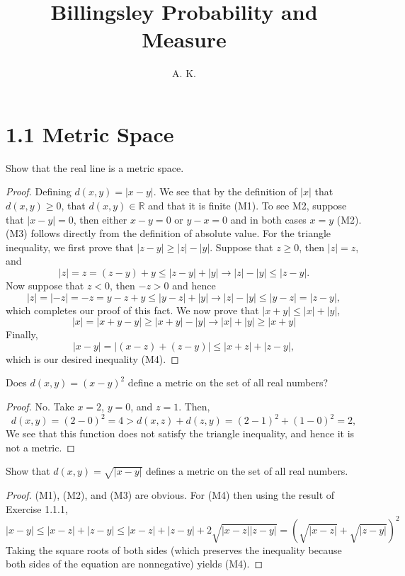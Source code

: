 \documentclass[12pt]{article}
\newcommand{\R}{\mathbb{R}}
\newenvironment{exercise}[2][Exercise]{\begin{trivlist}
\item[\hskip \labelsep {\bfseries #1}\hskip \labelsep {\bfseries #2.}]}{\end{trivlist}}
\begin{document}
\title{Billingsley Probability and Measure}%
\author{A. K.} %

\maketitle

\section*{1.1 Metric Space}
\begin{exercise}{1.1.1}
    Show that the real line is a metric space.
\end{exercise}
\begin{proof}
    Defining $d(x, y) = |x-y|$. We see that by the definition of $|x|$ that $d(x, y) \geq 0$, that $d(x, y) \in \R$ and that it is finite (M1). To see M2, suppose that $|x-y| = 0$, then either $x-y = 0$ or $y - x = 0$ and in both cases $x = y$ (M2). (M3) follows directly from the definition of absolute value. For the triangle inequality, we first prove that $|z-y| \geq |z| - |y|$. Suppose that $z \geq 0$, then $|z| = z$, and
    \[ |z| = z = (z-y) + y \leq |z-y| + |y| \rightarrow |z| - |y| \leq |z-y|. \]
    Now suppose that $z < 0$, then $-z > 0$ and hence
    \[ |z| = |-z| = -z = y-z + y \leq |y-z| + |y| \rightarrow |z| - |y| \leq |y-z| = |z-y|, \]
    which completes our proof of this fact. We now prove that $|x+y| \leq |x| + |y|$,
    \[ |x| = |x+y-y| \geq |x+y| - |y| \rightarrow |x| + |y| \geq |x+y| \]
    Finally,
    \[ |x-y| = |(x-z) + (z-y)| \leq |x+z| + |z-y|, \]
    which is our desired inequality (M4).
\end{proof}

\begin{exercise}{1.1.2}
    Does $d(x, y) = (x-y)^2$ define a metric on the set of all real numbers?
\end{exercise}
\begin{proof}
    No. Take $x = 2$, $y = 0$, and $z = 1$. Then,
    \[ d(x, y) = (2-0)^2 = 4 > d(x, z) + d(z, y) = (2-1)^2 + (1-0)^2 = 2, \]
    We see that this function does not satisfy the triangle inequality, and hence it is not a metric.
\end{proof}

\begin{exercise}{1.1.3}
    Show that $d(x, y) = \sqrt{ |x-y| }$ defines a metric on the set of all real numbers.
\end{exercise}
\begin{proof}
    (M1), (M2), and (M3) are obvious. For (M4) then using the result of Exercise 1.1.1,
    \[ |x-y| \leq |x-z| + |z-y| \leq |x-z| + |z-y| + 2 \sqrt{ |x-z| |z-y| } = (\sqrt{ |x-z| } + \sqrt{ |z-y | })^{2} \]
    Taking the square roots of both sides (which preserves the inequality because both sides of the equation are nonnegative) yields (M4).
\end{proof}
\end{document}
